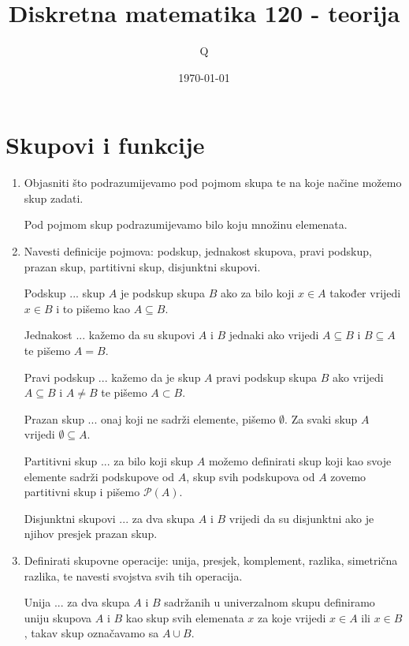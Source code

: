 \documentclass{article}
\title{\textbf{Diskretna matematika 120 - teorija}}
\author{Q}
\date{\today}
\begin{document}
\pagecolor{black}
\color{white}
\maketitle
\color{brightlavender}
\section{Skupovi i funkcije}
\color{white}

\begin{enumerate}

\item Objasniti što podrazumijevamo pod pojmom skupa te na koje načine možemo skup zadati.

Pod pojmom skup podrazumijevamo bilo koju množinu elemenata.

\item Navesti definicije pojmova: podskup, jednakost skupova, pravi podskup, prazan skup, partitivni skup, disjunktni skupovi.

Podskup ... skup $A$ je podskup skupa $B$ ako za bilo koji $x \in A$ također vrijedi $x \in B$ i to pišemo kao $A \subseteq B$.

Jednakost ... kažemo da su skupovi $A$ i $B$ jednaki ako vrijedi $A\subseteq B$ i $B\subseteq A$ te pišemo $A=B$.

Pravi podskup ... kažemo da je skup $A$ pravi podskup skupa $B$ ako vrijedi $A\subseteq B$ i $A\neq B$ te pišemo $A\subset B$.

Prazan skup ... onaj koji ne sadrži elemente, pišemo $\emptyset$. Za svaki skup $A$ vrijedi $\emptyset\subseteq A$.

Partitivni skup ... za bilo koji skup $A$ možemo definirati skup koji kao svoje elemente sadrži podskupove od $A$, skup svih podskupova od $A$ zovemo partitivni skup i pišemo $\mathcal{P}(A)$.

Disjunktni skupovi ... za dva skupa $A$ i $B$ vrijedi da su disjunktni ako je njihov presjek prazan skup.

\item Definirati skupovne operacije: unija, presjek, komplement, razlika, simetrična razlika, te navesti svojstva svih tih operacija.

Unija ... za dva skupa $A$ i $B$ sadržanih u univerzalnom skupu definiramo uniju skupova $A$ i $B$ kao skup svih elemenata $x$ za koje vrijedi $x\in A$ ili $x\in B$, takav skup označavamo sa $A\cup B$.


\end{enumerate}
\end{document}
